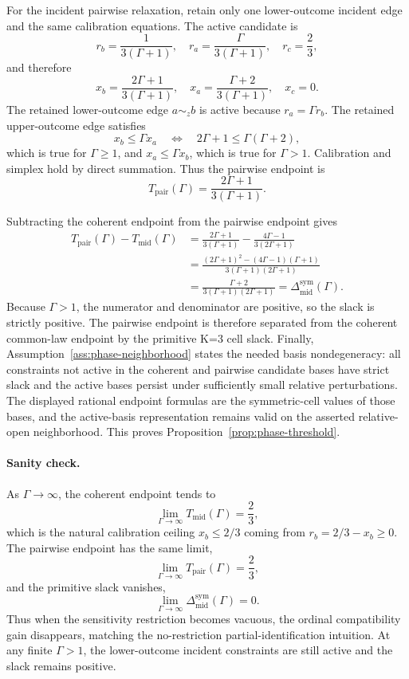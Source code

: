 For the incident pairwise relaxation, retain only one lower-outcome incident edge and the same calibration equations.  The active candidate is
\[
  r_b=\frac{1}{3(\Gamma+1)},\quad
  r_a=\frac{\Gamma}{3(\Gamma+1)},\quad
  r_c=\frac23,
\]
and therefore
\[
  x_b=\frac{2\Gamma+1}{3(\Gamma+1)},\quad
  x_a=\frac{\Gamma+2}{3(\Gamma+1)},\quad
  x_c=0.
\]
The retained lower-outcome edge \(a\sim_z b\) is active because \(r_a=\Gamma r_b\).  The retained upper-outcome edge satisfies
\[
  x_b\le \Gamma x_a
  \quad\Longleftrightarrow\quad
  2\Gamma+1\le \Gamma(\Gamma+2),
\]
which is true for \(\Gamma\ge 1\), and \(x_a\le \Gamma x_b\), which is true for \(\Gamma>1\).  Calibration and simplex hold by direct summation.  Thus the pairwise endpoint is
\[
  T_{\mathrm{pair}}(\Gamma)=\frac{2\Gamma+1}{3(\Gamma+1)}.
\]

Subtracting the coherent endpoint from the pairwise endpoint gives
\[
\begin{aligned}
  T_{\mathrm{pair}}(\Gamma)-T_{\mathrm{mid}}(\Gamma)
  &=
  \frac{2\Gamma+1}{3(\Gamma+1)}
  -
  \frac{4\Gamma-1}{3(2\Gamma+1)}
  \\
  &=
  \frac{(2\Gamma+1)^2-(4\Gamma-1)(\Gamma+1)}
       {3(\Gamma+1)(2\Gamma+1)}
  \\
  &=
  \frac{\Gamma+2}{3(\Gamma+1)(2\Gamma+1)}
  =
  \Delta_{\mathrm{mid}}^{\mathrm{sym}}(\Gamma).
\end{aligned}
\]
Because \(\Gamma>1\), the numerator and denominator are positive, so the slack is strictly positive.  The pairwise endpoint is therefore separated from the coherent common-law endpoint by the primitive K=3 cell slack.  Finally, Assumption~\ref{ass:phase-neighborhood} states the needed basis nondegeneracy: all constraints not active in the coherent and pairwise candidate bases have strict slack and the active bases persist under sufficiently small relative perturbations.  The displayed rational endpoint formulas are the symmetric-cell values of those bases, and the active-basis representation remains valid on the asserted relative-open neighborhood.  This proves Proposition~\ref{prop:phase-threshold}.

\paragraph{Sanity check.}
As \(\Gamma\to\infty\), the coherent endpoint tends to
\[
  \lim_{\Gamma\to\infty}T_{\mathrm{mid}}(\Gamma)=\frac23,
\]
which is the natural calibration ceiling \(x_b\le 2/3\) coming from \(r_b=2/3-x_b\ge0\).  The pairwise endpoint has the same limit,
\[
  \lim_{\Gamma\to\infty}T_{\mathrm{pair}}(\Gamma)=\frac23,
\]
and the primitive slack vanishes,
\[
  \lim_{\Gamma\to\infty}\Delta_{\mathrm{mid}}^{\mathrm{sym}}(\Gamma)=0.
\]
Thus when the sensitivity restriction becomes vacuous, the ordinal compatibility gain disappears, matching the no-restriction partial-identification intuition.  At any finite \(\Gamma>1\), the lower-outcome incident constraints are still active and the slack remains positive.

